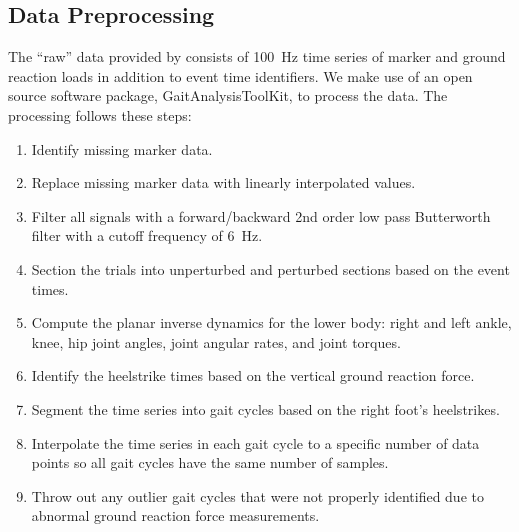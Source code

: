 \documentclass{article}
\begin{document}
\subsection*{Data Preprocessing}
%
The ``raw'' data provided by \cite{Moore2015} consists of 100~\si{\hertz} time
series of marker and ground reaction loads in addition to event time
identifiers. We make use of an open source software package,
GaitAnalysisToolKit, to process the data. The processing follows these steps:
%
\begin{enumerate}
  \item Identify missing marker data.
  \item Replace missing marker data with linearly interpolated values.
  \item Filter all signals with a forward/backward 2nd order low pass
    Butterworth filter with a cutoff frequency of 6~\si{\hertz}.
  \item Section the trials into unperturbed and perturbed sections based on the
    event times.
  \item Compute the planar inverse dynamics for the lower body: right and left
    ankle, knee, hip joint angles, joint angular rates, and joint torques.
  \item Identify the heelstrike times based on the vertical ground reaction
    force.
  \item Segment the time series into gait cycles based on the right foot's
    heelstrikes.
  \item Interpolate the time series in each gait cycle to a specific number of
    data points so all gait cycles have the same number of samples.
  \item Throw out any outlier gait cycles that were not properly identified due
    to abnormal ground reaction force measurements.
\end{enumerate}
\end{document}
